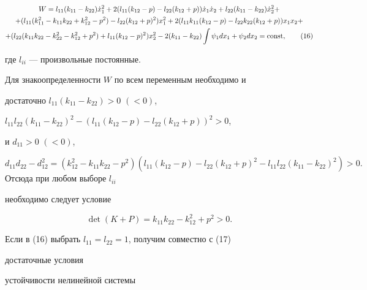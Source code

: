 \begin{multline}


W=l_{11}(k_{11}-k_{22})\Dot{x}_{1}^{2}+


2(l_{11}(k_{12}-p)-l_{22}(k_{12}+p))\Dot{x}_{1}\Dot{x}_{2}+


l_{22}(k_{11}-k_{22})\Dot{x}_{2}^{2}+ \\


%


+(l_{11}(k_{11}^{2}-k_{11}k_{22}+


k_{12}^{2}-p^{2})-l_{22}(k_{12}+p)^{2})x_{1}^{2}+


2(l_{11}k_{11}(k_{12}-p)-l_{22}k_{22}(k_{12}+p))x_{1}x_{2}+\\


%


+(l_{22}(k_{11}k_{22}-k_{22}^{2}-k_{12}^{2}+


p^{2})+l_{11}(k_{12}-p)^{2})x_{2}^{2}


-2(k_{11}-k_{22})\int \psi_{1}dx_{1}+\psi_{2}dx_{2}=\const, \tag{16}


\end{multline}


где $l_{ii}$ --- произвольные постоянные.





Для знакоопределенности $W$ по всем переменным необходимо и


достаточно $l_{11}(k_{11}-k_{22})>0$ $(<0)$,


$l_{11}l_{22}(k_{11}-k_{22})^{2}-(l_{11}(k_{12}-p)-l_{22}(k_{12}+p))^{2}>0$,


и $d_{11}>0$ $(<0)$,


$d_{11}d_{22}-d_{12}^{2}=


(k_{12}^{2}-k_{11}k_{22}-p^{2})(l_{11}(k_{12}-p)-l_{22}(k_{12}+p)^{2}-


l_{11}l_{22}(k_{11}-k_{22})^{2})>0.$ Отсюда при любом выборе $l_{ii}$


необходимо следует условие


\begin{equation}


\det(K+P)=k_{11}k_{22}-k_{12}^{2}+p^{2}>0. \tag{17}


\end{equation}


Если в (16) выбрать $l_{11}=l_{22}=1$, получим совместно с (17)


достаточные условия


устойчивости нелинейной системы


